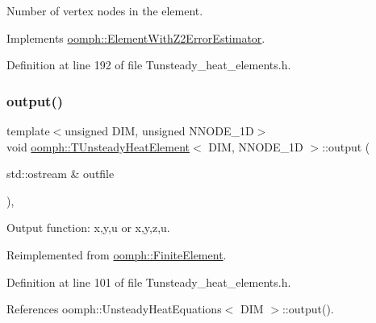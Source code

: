 Number of vertex nodes in the element. 



Implements \hyperlink{classoomph_1_1ElementWithZ2ErrorEstimator_a19495a0e77ef4ff35f15fdf7913b4077}{oomph\+::\+Element\+With\+Z2\+Error\+Estimator}.



Definition at line 192 of file Tunsteady\+\_\+heat\+\_\+elements.\+h.

\mbox{\label{classoomph_1_1TUnsteadyHeatElement_a03456d7b303e01a92f634a99fad1eacf}} 
\subsubsection{\texorpdfstring{output()}{output()}\hspace{0.1cm}{\footnotesize\ttfamily [1/4]}}
{\footnotesize\ttfamily template$<$unsigned D\+IM, unsigned N\+N\+O\+D\+E\+\_\+1D$>$ \\
void \hyperlink{classoomph_1_1TUnsteadyHeatElement}{oomph\+::\+T\+Unsteady\+Heat\+Element}$<$ D\+IM, N\+N\+O\+D\+E\+\_\+1D $>$\+::output (\begin{DoxyParamCaption}\item[{std\+::ostream \&}]{outfile }\end{DoxyParamCaption})\hspace{0.3cm}{\ttfamily [inline]}, {\ttfamily [virtual]}}



Output function\+: x,y,u or x,y,z,u. 



Reimplemented from \hyperlink{classoomph_1_1FiniteElement_a2ad98a3d2ef4999f1bef62c0ff13f2a7}{oomph\+::\+Finite\+Element}.



Definition at line 101 of file Tunsteady\+\_\+heat\+\_\+elements.\+h.



References oomph\+::\+Unsteady\+Heat\+Equations$<$ D\+I\+M $>$\+::output().

\mbox{\label{classoomph_1_1TUnsteadyHeatElement_a2602a84d853cda483fd52abadb524da9}} 
